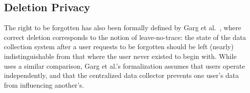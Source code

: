 %
%
%
%
%



\subsection{Deletion Privacy}
The right to be forgotten has also been formally defined by Garg et
al.~\cite{garg}, where correct deletion corresponds to the notion of
leave-no-trace: the state of the data collection system after a user requests to be forgotten should
be left (nearly) indistinguishable from that where the user never existed to begin with. While
\sys{} uses a similar comparison, Garg et al.'s formalization assumes that users operate
independently, and that the centralized data collector prevents one user's data from influencing
another's.

